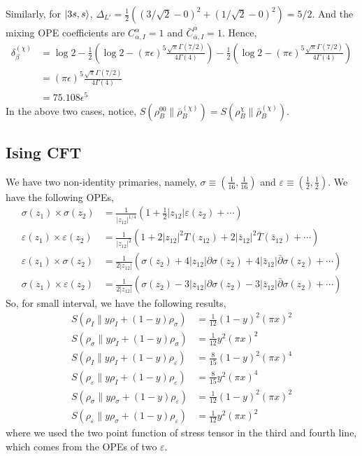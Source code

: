 \documentclass[11pt]{article}
\newcommand{\ep}{\epsilon}
\newcommand{\p}{\partial}
\newcommand{\lb}{\left(}
\newcommand{\rb}{\right)}
\begin{document}
Similarly, for $\ket{3s,s}$,
$\Delta_{L'} = \frac{1}{2}\lb\left(3/\sqrt{2}-0\right)^2
+ \left(1/\sqrt{2}-0\right)^2\rb = 5/2$.
And the mixing OPE coefficients are
$C_{\alpha,I}^{\alpha}=1$ and
$\bar{C}_{\bar{\alpha},I}^{\bar{\alpha}}=1$.
Hence,
\begin{align}
    \delta_\beta^{(\chi)}  &= \log 2 - \frac{1}{2}\lb \log 2 - (\pi \ep)^{5}\frac{\sqrt{\pi}\Gamma(7/2)}{4\Gamma(4)} \rb - \frac{1}{2}\lb  \log 2 - (\pi \ep)^{5}\frac{\sqrt{\pi}\Gamma(7/2)}{4\Gamma(4)}\rb  \\
    &=(\pi \ep)^{5}\frac{\sqrt{\pi}\Gamma(7/2)}{4\Gamma(4)} \\
    &= 75.108 \ep^{5} 
\end{align}
In the above two cases, notice, $S(\rho_B^{00} \| \bar \rho^{(\chi)}_B  ) = S(\rho^\chi_B \| \bar \rho ^{(\chi)}_B) $. 

\subsection{Ising CFT}
We have two non-identity primaries, namely, $\sigma \equiv
 \lb \frac{1}{16}, \frac{1}{16}\rb$ and $\varepsilon\equiv \lb \frac{1}{2},\frac{1}{2}\rb$. 
We have the following OPEs,
\begin{align}
    \sigma(z_1)\times \sigma(z_2) &= \frac{1}{|z_{12}|^{1/4}}\lb 1+ \frac{1}{2} |z_{12}| \varepsilon(z_{2}) + \cdots \rb \\
    \varepsilon(z_1) \times \varepsilon(z_2) &= \frac{1}{|z_{12}|^2} \lb 1+ 2|z_{12}|^2 T(z_{12}) + 2|\bar{z}_{12}|^2\bar{T}(\bar{z}_{12})  + \cdots\rb \\
    \varepsilon(z_1) \times \sigma(z_2) &= \frac{1}{2|z_{12}|}\lb \sigma(z_2) + 4|z_{12}| \p \sigma(z_2) + 4|\bar{z}_{12}|\bar{\p}\sigma  (z_2) + \cdots \rb \\
    \sigma(z_1) \times \varepsilon(z_2) &= \frac{1}{2|z_{12}|}\lb \sigma(z_2) -3|z_{12}| \p \sigma(z_2) -3|\bar{z}_{12}|\bar{\p}\sigma  (z_2) + \cdots \rb 
\end{align}
So, for small interval, we have the following results,
\begin{align}
    S(\rho_I \| y \rho_I + (1-y)\rho_\sigma) &= \frac{1}{12} (1-y)^2(\pi x)^2 \\
    S(\rho_\sigma \| y \rho_I + (1-y)\rho_\sigma) &= \frac{1}{12} y^2(\pi x)^2 \\ 
    S(\rho_I \| y \rho_I + (1-y)\rho_\varepsilon) &= \frac{8}{15} (1-y)^2 (\pi x)^4 \\
    S(\rho_\varepsilon \| y \rho_I + (1-y)\rho_\varepsilon) &= \frac{8}{15} y^2 (\pi x)^4 \\
    S(\rho_\sigma \| y \rho_\sigma + (1-y)\rho_\varepsilon) &= \frac{1}{12} (1-y)^2(\pi x)^2 \\
    S(\rho_\varepsilon \| y \rho_\sigma + (1-y)\rho_\varepsilon) &= \frac{1}{12} y^2(\pi x)^2
\end{align}
where we used the two point function of stress tensor in the third and fourth line, which comes from the OPEs of two $\varepsilon$.
\end{document}
